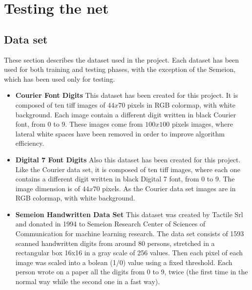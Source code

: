 \documentclass[letterpaper,twocolumn,10pt]{article}
\begin{document}
\section{Testing the net}

\subsection{Data set}
These section describes the dataset used in the project. Each dataset has been used for both training and testing phases, with the exception of the Semeion, which has been used only for testing.
\begin{itemize}
\item\textbf{Courier Font Digits} This dataset has been created for this project. It is composed of ten tiff images of $44x70$ pixels in RGB colormap, with white background. Each image contain a different digit written in black Courier font, from 0 to 9. These images come from $100x100$ pixels images, where lateral white spaces have been removed in order to improve algorithm efficiency.
\item\textbf{Digital 7 Font Digits} Also this dataset has been created for this project. Like the Courier data set, it is composed of ten tiff images, where each one contains a different digit written in black Digital 7 font, from 0 to 9. The image dimension is of $44x70$ pixels. As the Courier data set images are in RGB colormap, with white background. 
\item\textbf{Semeion Handwritten Data Set} This dataset was created by Tactile Srl and donated in 1994 to Semeion Research Center of Sciences of Communication for machine learning research. The data set  consists of 1593 scanned handwritten digits from around 80 persons, stretched in a rectangular box 16x16 in a gray scale of 256 values. Then each pixel of each image was scaled into a bolean (1/0) value using a fixed threshold. Each person wrote on a paper all the digits from 0 to 9, twice (the first time in the normal way while the second one in a fast way)\cite{semeion}.
\end{itemize}
\end{document}
